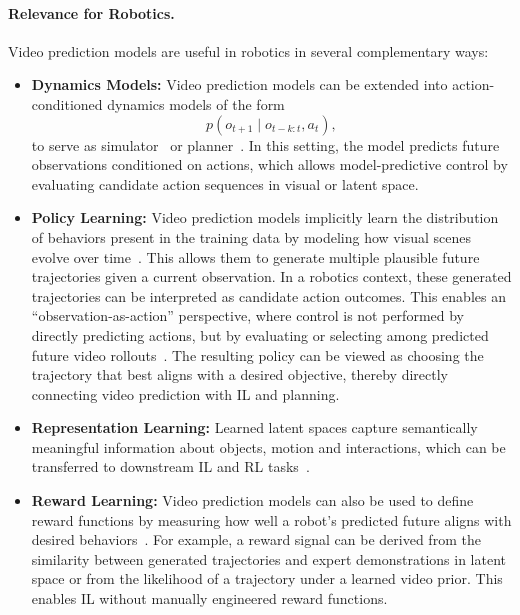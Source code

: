\paragraph{Relevance for Robotics.}
Video prediction models are useful in robotics in several complementary ways:
\begin{itemize}
    \item \textbf{Dynamics Models:}
    Video prediction models can be extended into action-conditioned dynamics models of the form
    \begin{equation}
    p(o_{t+1} \mid o_{t-k:t}, a_t),
    \end{equation}
    to serve as simulator~\cite{Yang2023LearningIR} or planner~\cite{Du2023VideoLP}. 
    In this setting, the model predicts future observations conditioned on actions, which allows model-predictive control by evaluating candidate action sequences in visual or latent space.

    \item \textbf{Policy Learning:}
    Video prediction models implicitly learn the distribution of behaviors present in the training data by modeling how visual scenes evolve over time~\cite{Escontrela2023VideoPM}. This allows them to generate multiple plausible future trajectories given a current observation. In a robotics context, these generated trajectories can be interpreted as candidate action outcomes.
    This enables an ``observation-as-action'' perspective, where control is not performed by directly predicting actions, but by evaluating or selecting among predicted future video rollouts~\cite{Du2023LearningUP}. The resulting policy can be viewed as choosing the trajectory that best aligns with a desired objective, 
    thereby directly connecting video prediction with \ac{IL} and planning.

    \item \textbf{Representation Learning:} Learned latent spaces capture semantically meaningful information about objects, motion and interactions, which can be transferred to downstream \ac{IL} and \ac{RL} tasks~\cite{Wu2023UnleashingLV, McCarthy_2025}.

    \item \textbf{Reward Learning:} 
    Video prediction models can also be used to define reward functions by measuring how well a robot's predicted future aligns with desired behaviors~\cite{Escontrela2023VideoPM}. For example, a reward signal can be derived from the similarity between generated trajectories and expert demonstrations in latent space or from the likelihood of a trajectory under a learned video prior. This enables \ac{IL} without manually engineered reward functions.
\end{itemize}

